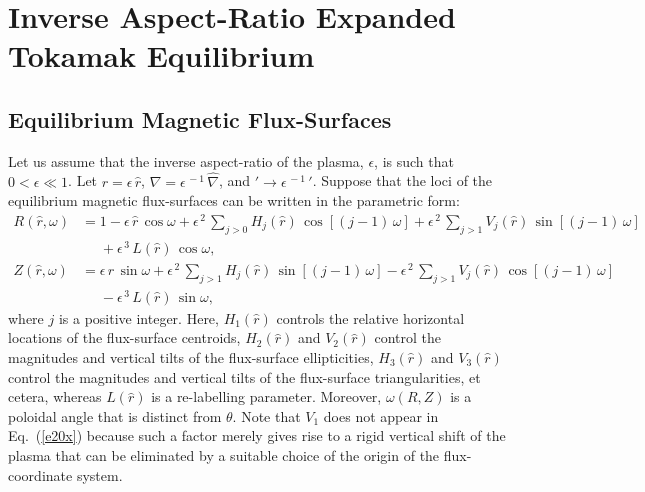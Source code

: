 \documentclass[12pt,prb,aps]{revtex4-1}
\begin{document}
\section{Inverse Aspect-Ratio Expanded Tokamak Equilibrium}
\subsection{Equilibrium Magnetic Flux-Surfaces}
Let us assume that the inverse aspect-ratio of the plasma, $\epsilon$, is such that $0<\epsilon\ll 1$.  
Let $r=\epsilon\,\hat{r}$, $\nabla =\epsilon^{\,-1}\,\hat{\nabla}$, and $'\rightarrow \epsilon^{\,-1}\,'$. 
Suppose that the loci of the equilibrium magnetic flux-surfaces can be written in the parametric form:\,\cite{con0,gim,am1,fitz2024}
\begin{align}
R(\hat{r},\omega) &= 1 -\epsilon\,\hat{r}\,\cos\omega + \epsilon^{\,2}\,\sum_{j>0}H_j(\hat{r})\,\cos[(j-1)\,\omega] + \epsilon^{\,2}\,\sum_{j>1}V_j(\hat{r})\,\sin[(j-1)\,\omega] \nonumber\\[0.5ex]
&\phantom{=}+\epsilon^{\,3}\,L(\hat{r})\,\cos\omega,\label{e19x}\\[0.5ex]
Z(\hat{r},\omega)&= \epsilon\,\hat{r}\,\sin\omega +\epsilon^{\,2}\,\sum_{j>1}H_j(\hat{r})\,\sin[(j-1)\,\omega]
-\epsilon^{\,2}\,\sum_{j>1}V_j(\hat{r})\,\cos[(j-1)\,\omega]\nonumber\\[0.5ex]&\phantom{=}-\epsilon^{\,3}\,L(\hat{r})\,\sin\omega,\label{e20x}
\end{align}
where $j$ is a positive integer. 
Here, $H_1(\hat{r})$  controls the relative horizontal locations of the flux-surface centroids, $H_2(\hat{r})$ and $V_2(\hat{r})$ control the 
magnitudes and vertical tilts of the flux-surface ellipticities, $H_3(\hat{r})$ and
$V_3(\hat{r})$ control the magnitudes and vertical tilts of the flux-surface triangularities, et cetera, whereas $L(\hat{r})$ is a
re-labelling parameter. Moreover, $\omega(R,Z)$ is a  poloidal angle that is distinct from $\theta$. Note that $V_1$ does not appear in Eq.~(\ref{e20x})
because such a factor merely gives rise to a rigid vertical shift of the plasma that can be eliminated by a suitable choice of the
origin of the flux-coordinate system.\cite{fitz2024}
\end{document}
